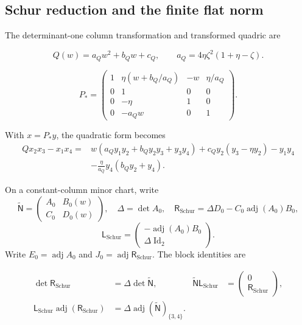 \subsection{Schur reduction and the finite flat norm}

The determinant-one column transformation and transformed quadric are

\begin{equation}\label{supp:r3:Qcoefficients}
Q(w)=a_Qw^2+b_Qw+c_Q,\qquad
a_Q=4\eta \zeta ^2(1+\eta -\zeta ).
\end{equation}

\begin{equation}\label{supp:r3:columntransform}
P_*=
\begin{pmatrix}
1&\eta (w+b_Q/a_Q)&-w&\eta /a_Q\\
0&1&0&0\\
0&-\eta &1&0\\
0&-a_Qw&0&1
\end{pmatrix}.
\end{equation}

With $x=P_*y$, the quadratic form becomes
\begin{equation}\label{supp:r3:transformedmomentquadric}
\begin{aligned}
Qx_2x_3-x_1x_4
={}&w(a_Qy_1y_2+b_Qy_2y_3+y_3y_4)
  +c_Qy_2(y_3-\eta y_2)-y_1y_4\\
 &-\frac{\eta }{a_Q}y_4(b_Qy_2+y_4).
\end{aligned}
\end{equation}

On a constant-column minor chart, write
\[
 \widetilde{\mathsf N}=\begin{pmatrix}A_0&B_0(w)\\C_0&D_0(w)\end{pmatrix},
 \quad\Delta=\det A_0,\quad
 \mathsf R_{\mathrm{Schur}}=\Delta D_0-C_0\operatorname{adj}(A_0)B_0,
\]
\[
 \mathsf L_{\mathrm{Schur}}=
       \begin{pmatrix}-\operatorname{adj}(A_0)B_0\\\Delta\operatorname{Id}_2\end{pmatrix}.
\]
Write $E_0=\operatorname{adj}A_0$ and
$J_0=\operatorname{adj}\mathsf R_{\mathrm{Schur}}$. The block identities are

\begin{align}
 \det\mathsf R_{\mathrm{Schur}}&=\Delta\det\widetilde{\mathsf N},
 &\widetilde{\mathsf N}\mathsf L_{\mathrm{Schur}}&=\begin{pmatrix}0\\\mathsf R_{\mathrm{Schur}}\end{pmatrix},
 \label{supp:r3schur:basic}\\
 \mathsf L_{\mathrm{Schur}}\operatorname{adj}(\mathsf R_{\mathrm{Schur}})
 &=\Delta\operatorname{adj}(\widetilde{\mathsf N})_{\{3,4\}}.
 \label{supp:r3schur:columns}
\end{align}

